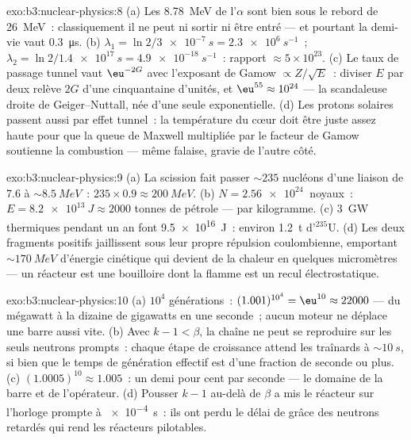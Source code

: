 \begin{solution}{exo:b3:nuclear-physics:8}
(a) Les \qty{8.78}{MeV} de l'$\alpha$ sont bien sous le rebord de
\qty{26}{MeV}~: classiquement il ne peut ni sortir ni être entré ---
et pourtant la demi-vie vaut \qty{0.3}{\micro s}. (b)
$\lambda_1 = \ln2/\qty{3e-7}{s} = \qty{2.3e6}{s^{-1}}$~;
$\lambda_2 = \ln2/\qty{1.4e17}{s} = \qty{4.9e-18}{s^{-1}}$~:
rapport $\approx 5\times10^{23}$. (c) Le taux de passage tunnel vaut
$\eu^{-2G}$ avec l'exposant de Gamow $\propto Z/\sqrt E$~: diviser
$E$ par deux relève $2G$ d'une cinquantaine d'unités, et
$\eu^{55} \approx 10^{24}$ --- la scandaleuse droite de
Geiger--Nuttall, née d'une seule exponentielle. (d) Les protons
solaires passent aussi par effet tunnel~: la température du cœur doit
être juste assez haute pour que la queue de Maxwell multipliée par le
facteur de Gamow soutienne la combustion --- même falaise, gravie de
l'autre côté.
\end{solution}

\begin{solution}{exo:b3:nuclear-physics:9}
(a) La scission fait passer ${\sim}235$ nucléons d'une liaison de
\qty{7.6}{} à ${\sim}\qty{8.5}{MeV}$~: $235\times0.9 \approx
\qty{200}{MeV}$. (b) $N = \qty{2.56e24}{}$ noyaux~:
$E = \qty{8.2e13}{J} \approx 2000$ tonnes de pétrole --- par
kilogramme. (c) \qty{3}{GW} thermiques pendant un an font
\qty{9.5e16}{J}~: environ \qty{1.2}{t} d'$^{235}$U. (d) Les deux
fragments positifs jaillissent sous leur propre répulsion
coulombienne, emportant ${\sim}\qty{170}{MeV}$ d'énergie cinétique
qui devient de la chaleur en quelques micromètres --- un réacteur est
une bouilloire dont la flamme est un recul électrostatique.
\end{solution}

\begin{solution}{exo:b3:nuclear-physics:10}
(a) $10^4$ générations~: $(1.001)^{10^4} = \eu^{10} \approx
22000$ --- du mégawatt à la dizaine de gigawatts en une seconde~;
aucun moteur ne déplace une barre aussi vite. (b) Avec
$k - 1 < \beta$, la chaîne ne peut se reproduire sur les seuls
neutrons prompts~: chaque étape de croissance attend les traînards à
${\sim}\qty{10}{s}$, si bien que le temps de génération effectif est
d'une fraction de seconde ou plus. (c)
$(1.0005)^{10} \approx 1.005$~: un demi pour cent par seconde ---
le domaine de la barre et de l'opérateur. (d) Pousser $k - 1$
au-delà de $\beta$ a mis le réacteur sur l'horloge prompte à
\qty{e-4}{s}~: ils ont perdu le délai de grâce des neutrons retardés
qui rend les réacteurs pilotables.
\end{solution}

